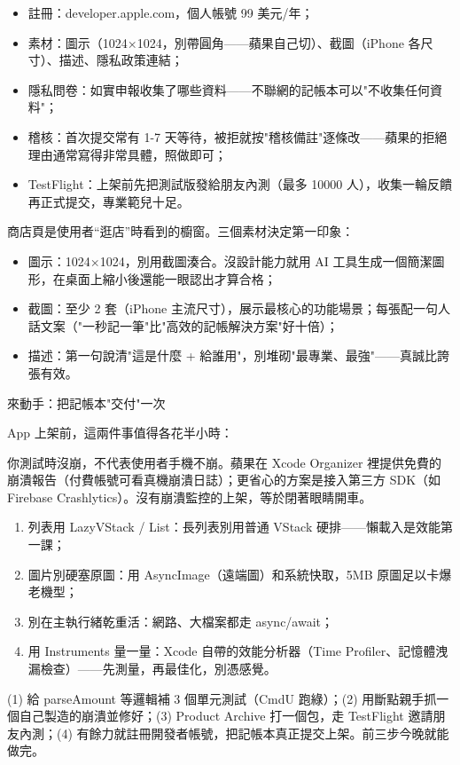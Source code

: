 \begin{itemize}
  \item 註冊：developer.apple.com，個人帳號 99 美元/年；
  \item 素材：圖示（1024×1024，別帶圓角——蘋果自己切）、截圖（iPhone 各尺寸）、描述、隱私政策連結；
  \item 隱私問卷：如實申報收集了哪些資料——不聯網的記帳本可以"不收集任何資料"；
  \item 稽核：首次提交常有 1-7 天等待，被拒就按"稽核備註"逐條改——蘋果的拒絕理由通常寫得非常具體，照做即可；
  \item TestFlight：上架前先把測試版發給朋友內測（最多 10000 人），收集一輪反饋再正式提交，專業範兒十足。
\end{itemize}


商店頁是使用者“逛店”時看到的櫥窗。三個素材決定第一印象：

\begin{itemize}
  \item 圖示：1024×1024，別用截圖湊合。沒設計能力就用 AI 工具生成一個簡潔圖形，在桌面上縮小後還能一眼認出才算合格；
  \item 截圖：至少 2 套（iPhone 主流尺寸），展示最核心的功能場景；每張配一句人話文案（"一秒記一筆"比"高效的記帳解決方案"好十倍）；
  \item 描述：第一句說清"這是什麼 + 給誰用"，別堆砌"最專業、最強"——真誠比誇張有效。
\end{itemize}

\begin{tcbpractice}{來動手：把記帳本"交付"一次}

App 上架前，這兩件事值得各花半小時：


你測試時沒崩，不代表使用者手機不崩。蘋果在 Xcode Organizer 裡提供免費的崩潰報告（付費帳號可看真機崩潰日誌）；更省心的方案是接入第三方 SDK（如 Firebase Crashlytics）。沒有崩潰監控的上架，等於閉著眼睛開車。


\begin{enumerate}
  \item 列表用 LazyVStack / List：長列表別用普通 VStack 硬排——懶載入是效能第一課；
  \item 圖片別硬塞原圖：用 AsyncImage（遠端圖）和系統快取，5MB 原圖足以卡爆老機型；
  \item 別在主執行緒乾重活：網路、大檔案都走 async/await；
  \item 用 Instruments 量一量：Xcode 自帶的效能分析器（Time Profiler、記憶體洩漏檢查）——先測量，再最佳化，別憑感覺。
\end{enumerate}

(1) 給 parseAmount 等邏輯補 3 個單元測試（CmdU 跑綠）；(2) 用斷點親手抓一個自己製造的崩潰並修好；(3) Product Archive 打一個包，走 TestFlight 邀請朋友內測；(4) 有餘力就註冊開發者帳號，把記帳本真正提交上架。前三步今晚就能做完。

\end{tcbpractice}

